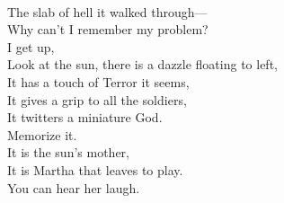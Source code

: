 \documentclass[smalldemyvopaper,11pt,twoside,onecolumn,openright,extrafontsizes]{memoir}
\begin{document}
\\The slab of hell it walked through—
\\Why can't I remember my problem?
\\I get up,
\\Look at the sun, there is a dazzle floating to left,
\\It has a touch of Terror it seems,
\\It gives a grip to all the soldiers,
\\It twitters a miniature God.
\\Memorize it.
\\It is the sun's mother,
\\It is Martha that leaves to play.
\\You can hear her laugh.
\end{document}
